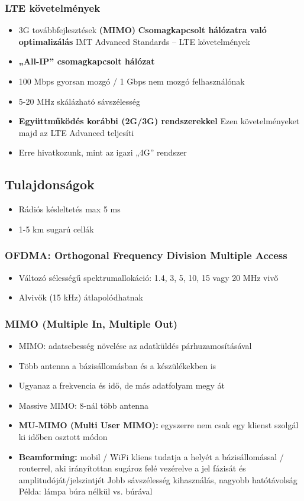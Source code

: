 \documentclass[10pt,a4paper]{article}
\begin{document}
\subsubsection{LTE követelmények}
\begin{itemize}
\item 3G továbbfejlesztések \textbf{(MIMO)}
\subitem \textbf{Csomagkapcsolt hálózatra való optimalizálás}
\subitem IMT Advanced Standards – LTE követelmények
\item\textbf{ „All-IP” csomagkapcsolt hálózat}
\item 100 Mbps gyorsan mozgó / 1 Gbps nem mozgó felhasználónak
\item 5-20 MHz skálázható sávszélesség
\item \textbf{Együttműködés korábbi (2G/3G) rendszerekkel}
\subitem Ezen követelményeket majd az LTE Advanced teljesíti
\item Erre hivatkozunk, mint az igazi „4G” rendszer
\end{itemize}
\subsection{Tulajdonságok}
\begin{itemize}
	\item Rádiós késleltetés max 5 ms
	\item 1-5 km sugarú cellák
\end{itemize}
\subsubsection{OFDMA: Orthogonal Frequency Division Multiple Access}
	\begin{itemize} 
		\item Változó sélességű spektrumallokáció: 1.4, 3, 5, 10, 15 vagy 20 MHz vivő
		\item Alvivők (15 kHz) átlapolódhatnak
	\end{itemize}
\subsubsection{MIMO (Multiple In, Multiple Out)}
	\begin{itemize}
		\item MIMO: adatsebesség növelése az
		adatküldés párhuzamosításával
		\item  Több antenna a bázisállomásban és
		a készülékekben is
		\item  Ugyanaz a frekvencia és idő, de
		más adatfolyam megy át
		\item  Massive MIMO: 8-nál több antenna
		\item  \textbf{MU-MIMO (Multi User MIMO):} egyszerre nem csak egy klienst szolgál ki időben osztott módon
		\item \textbf{Beamforming:} mobil / WiFi kliens
		tudatja a helyét a bázisállomással /
		routerrel, aki irányítottan sugároz
		felé vezérelve a jel fázisát és
		amplitudóját/jelszintjét
		\subitem  Jobb sávszélesség kihasználás,
		nagyobb hatótávolság
			\subitem Példa: lámpa búra nélkül vs. búrával
	\end{itemize}
\end{document}
